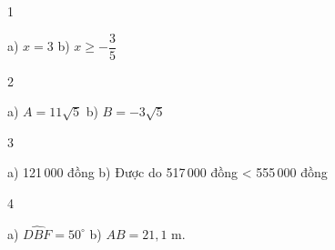 \begin{Solbook}{1}
 \par \noindent  a) $x=3$ \hspace {2cm} b) $x \ge -\dfrac {3}{5} $  \hfill \qedEX 
\end{Solbook}
\begin{Solbook}{2}
 \par \noindent  a) $A=11\sqrt {5}$ \hspace {2cm} b) $B=-3\sqrt {5}$  \hfill \qedEX 
\end{Solbook}
\begin{Solbook}{3}
 \par \noindent  a) 121\,000 đồng \hspace {2cm} b) Được do 517\,000 đồng < 555\,000 đồng  \hfill \qedEX 
\end{Solbook}
\begin{Solbook}{4}
 \par \noindent a) $\widehat {DBF}=50^\circ $ \hfill b) $AB=21,1$ m. \hfill  \hfill \qedEX 
\end{Solbook}
